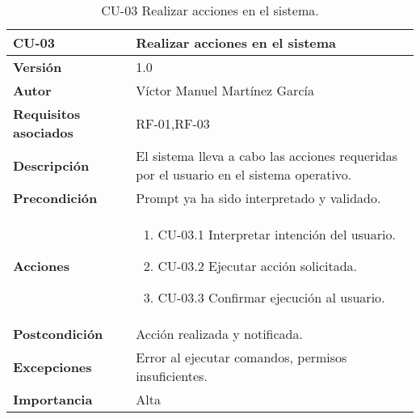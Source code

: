 \begin{table}[p]
    \centering
    \begin{tabularx}{\linewidth}{ p{} p{} }
    \toprule
    \textbf{CU-03}    & \textbf{Realizar acciones en el sistema}\\
        \toprule
        \textbf{Versión}              & 1.0 \\
        \textbf{Autor}                & Víctor Manuel Martínez García \\
        \textbf{Requisitos asociados} & RF-01,RF-03 \\
        \textbf{Descripción}          & El sistema lleva a cabo las acciones requeridas por el usuario en el sistema operativo.\\
        \textbf{Precondición}         & Prompt ya ha sido interpretado y validado.\\
        \textbf{Acciones}             &
        \begin{enumerate}
          \item CU-03.1 Interpretar intención del usuario.
          \item CU-03.2 Ejecutar acción solicitada.
          \item CU-03.3 Confirmar ejecución al usuario.
        \end{enumerate}\\
        \textbf{Postcondición}        & Acción realizada y notificada.\\
        \textbf{Excepciones}          & Error al ejecutar comandos, permisos insuficientes.\\
        \textbf{Importancia}          & Alta \\
        \bottomrule
    \end{tabularx}
    \caption{CU-03 Realizar acciones en el sistema.}
    \label{CU-03 Realizar acciones en el sistema}
\end{table}


